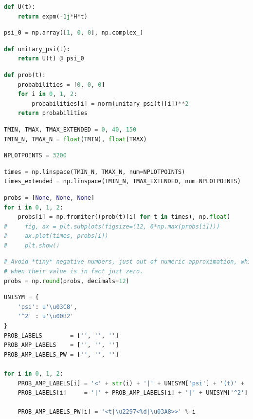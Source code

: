 \begin{lstlisting}[language=Python]
def U(t):
    return expm(-1j*H*t)
\end{lstlisting}

\begin{lstlisting}[language=Python]
psi_0 = np.array([1, 0, 0], np.complex_)
\end{lstlisting}

\begin{lstlisting}[language=Python]
def unitary_psi(t):
    return U(t) @ psi_0
\end{lstlisting}

\begin{lstlisting}[language=Python]
def prob(t):
    probabilities = [0, 0, 0]
    for i in 0, 1, 2:
        probabilities[i] = norm(unitary_psi(t)[i])**2
    return probabilities
\end{lstlisting}

\begin{lstlisting}[language=Python]
TMIN, TMAX, TMAX_EXTENDED = 0, 40, 150
TMIN_N, TMAX_N = float(TMIN), float(TMAX)
\end{lstlisting}

\begin{lstlisting}[language=Python]
NPLOTPOINTS = 3200
\end{lstlisting}

\begin{lstlisting}[language=Python]
times = np.linspace(TMIN_N, TMAX_N, num=NPLOTPOINTS)
times_extended = np.linspace(TMIN_N, TMAX_EXTENDED, num=NPLOTPOINTS)
\end{lstlisting}

\begin{lstlisting}[language=Python]
probs = [None, None, None]
for i in 0, 1, 2:
    probs[i] = np.fromiter((prob(t)[i] for t in times), np.float)
#     fig, ax = plt.subplots(figsize=(12, 6*np.max(probs[i])))
#     ax.plot(times, probs[i])
#     plt.show()
\end{lstlisting}

\begin{lstlisting}[language=Python]
# Avoid *tiny* negative numbers, just out of numeric approximation, which will cause problems later,
# when their value is in fact juzt zero.
probs = np.round(probs, decimals=12)
\end{lstlisting}

\begin{lstlisting}[language=Python]
UNISYM = {
    'psi': u'\u03C8',
    '^2' : u'\u00B2'
}
PROB_LABELS        = ['', '', '']
PROB_AMP_LABELS    = ['', '', '']
PROB_AMP_LABELS_PW = ['', '', '']

for i in 0, 1, 2:
    PROB_AMP_LABELS[i] = '<' + str(i) + '|' + UNISYM['psi'] + '(t)' + '>'
    PROB_LABELS[i]     = '|' + PROB_AMP_LABELS[i] + '|' + UNISYM['^2']

    PROB_AMP_LABELS_PW[i] = '<t|\u2297<%d|\u03A8>>' % i
\end{lstlisting}

